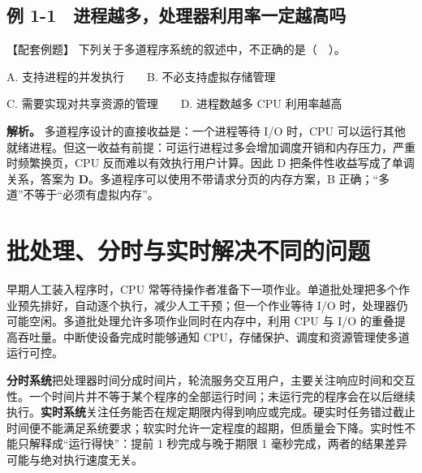 \subsection{例 1-1　进程越多，处理器利用率一定越高吗}\label{OS01-ex1-1}

{\begin{example}[配套例题]

【配套例题】 下列关于多道程序系统的叙述中，不正确的是（　）。

A. 支持进程的并发执行　　B. 不必支持虚拟存储管理

C. 需要实现对共享资源的管理　　D. 进程数越多 CPU 利用率越高

\end{example}}

\textbf{解析。} 多道程序设计的直接收益是：一个进程等待 I/O 时，CPU 可以运行其他就绪进程。但这一收益有前提：可运行进程过多会增加调度开销和内存压力，严重时频繁换页，CPU 反而难以有效执行用户计算。因此 D 把条件性收益写成了单调关系，答案为 \textbf{D}。多道程序可以使用不带请求分页的内存方案，B 正确；``多道''不等于``必须有虚拟内存''。

\section{批处理、分时与实时解决不同的问题}\label{OS01-1-2}

早期人工装入程序时，CPU 常等待操作者准备下一项作业。单道批处理把多个作业预先排好，自动逐个执行，减少人工干预；但一个作业等待 I/O 时，处理器仍可能空闲。多道批处理允许多项作业同时在内存中，利用 CPU 与 I/O 的重叠提高吞吐量。中断使设备完成时能够通知 CPU，存储保护、调度和资源管理使多道运行可控。

\textbf{分时系统}把处理器时间分成时间片，轮流服务交互用户，主要关注响应时间和交互性。一个时间片并不等于某个程序的全部运行时间；未运行完的程序会在以后继续执行。\textbf{实时系统}关注任务能否在规定期限内得到响应或完成。硬实时任务错过截止时间便不能满足系统要求；软实时允许一定程度的超期，但质量会下降。实时性不能只解释成``运行得快''：提前 1 秒完成与晚于期限 1 毫秒完成，两者的结果差异可能与绝对执行速度无关。

